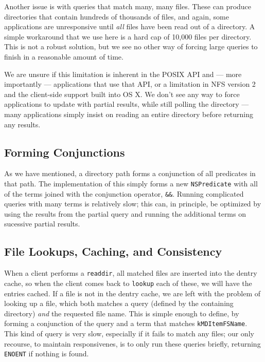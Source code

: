 \documentclass{article}
\begin{document}
Another issue is with queries that match many, many files. These can
produce directories that contain hundreds of thousands of files, and
again, some applications are unresponsive until \emph{all} files have
been read out of a directory. A simple workaround that we use here is
a hard cap of 10,000 files per directory. This is not a robust
solution, but we see no other way of forcing large queries to finish
in a reasonable amount of time.

We are unsure if this limitation is inherent in the POSIX API and ---
more importantly --- applications that use that API, or a limitation
in NFS version 2 and the client-side support built into OS X. We don't
see any way to force applications to update with partial results,
while still polling the directory --- many applications simply insist
on reading an entire directory before returning any results.

\subsection{Forming Conjunctions}

As we have mentioned, a directory path forms a conjunction of all
predicates in that path. The implementation of this simply forms a new
\texttt{NSPredicate} with all of the terms joined with the conjunction
operator, \texttt{\&\&}. Running complicated queries with many terms
is relatively slow; this can, in principle, be optimized by using the
results from the partial query and running the additional terms on
sucessive partial results.

\subsection{File Lookups, Caching, and Consistency}

When a client performs a \texttt{readdir}, all matched files are
inserted into the dentry cache, so when the client comes back to
\texttt{lookup} each of these, we will have the entries cached. If a
file is not in the dentry cache, we are left with the problem of
looking up a file, which both matches a query (defined by the
containing directory) \emph{and} the requested file name. This is
simple enough to define, by forming a conjunction of the query and a
term that matches \texttt{kMDItemFSName}. This kind of query is very
slow, especially if it fails to match any files; our only recourse, to
maintain responsivenes, is to only run these queries briefly,
returning \texttt{ENOENT} if nothing is found.
\end{document}
